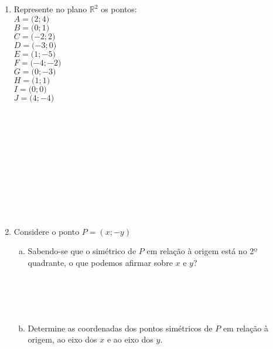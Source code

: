 \documentclass[a4paper,14pt]{article}
\begin{document}
\begin{multicols}{2}
\begin{enumerate}
            \item Represente no plano $\mathbb{R}^2$ os pontos:\\
            $A = \big(2; 4\big)$\\
            $B = \big(0; 1\big)$\\
            $C = \big({-2}; 2\big)$\\
            $D = \big({-3}; 0\big)$\\
            $E = \big(1; {-5}\big)$\\
            $F = \big({-4}; {-2}\big)$\\
            $G = \big(0; {-3}\big)$\\
            $H = \big(1; 1\big)$\\
            $I = \big(0; 0\big)$\\
            $J = \big(4; {-4}\big)$\\\\\\\\\\\\\\\\\\\\\\
            \item Considere o ponto $P = (x; {-y})$
            \begin{enumerate}[a)]
            	\item Sabendo-se que o simétrico de $P$ em relação à origem está no 2º quadrante, o que podemos afirmar sobre $x$ e $y$?\\\\\\\\\\
            	\item Determine as coordenadas dos pontos simétricos de $P$ em relação à origem, ao eixo dos $x$ e ao eixo dos $y$.
            \end{enumerate}
        \end{enumerate} 
    $~$ \\ $~$ \\ $~$ \\ $~$ \\ $~$ \\ $~$ \\ $~$ \\ $~$ \\ $~$ \\ $~$ \\ $~$ \\ $~$ \\ $~$ \\
    \end{multicols}
\end{document}
